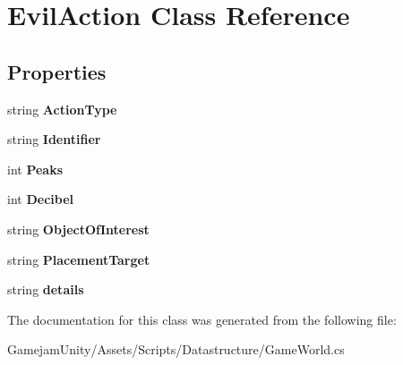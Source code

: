 \hypertarget{class_evil_action}{}\section{Evil\+Action Class Reference}
\label{class_evil_action}
\subsection*{Properties}
\begin{DoxyCompactItemize}
\item 
\mbox{\label{class_evil_action_abc6755207782133791be9f3fcbcf3f38}} 
string {\bfseries Action\+Type}
\item 
\mbox{\label{class_evil_action_aaa3e372427800c55e8a8577f23080103}} 
string {\bfseries Identifier}
\item 
\mbox{\label{class_evil_action_aba365e771fba0af37b9d9dcdf6ce9d85}} 
int {\bfseries Peaks}
\item 
\mbox{\label{class_evil_action_ab55a3d31911a5ff2250abc79d34d7d7e}} 
int {\bfseries Decibel}
\item 
\mbox{\label{class_evil_action_af03e783992d0a5f35e6a7c677ad1cf38}} 
string {\bfseries Object\+Of\+Interest}
\item 
\mbox{\label{class_evil_action_ac096415964b737941bc4088a357a79da}} 
string {\bfseries Placement\+Target}
\item 
\mbox{\label{class_evil_action_a67f145a7e91790942e92ec6e51288499}} 
string {\bfseries details}
\end{DoxyCompactItemize}


The documentation for this class was generated from the following file\+:\begin{DoxyCompactItemize}
\item 
Gamejam\+Unity/\+Assets/\+Scripts/\+Datastructure/Game\+World.\+cs\end{DoxyCompactItemize}

